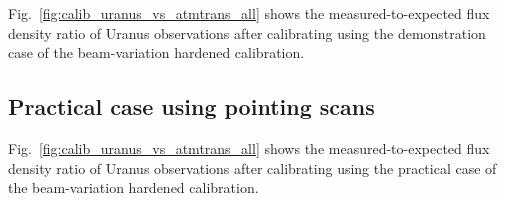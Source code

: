
Fig.~\ref{fig:calib_uranus_vs_atmtrans_all} shows the
measured-to-expected flux density ratio of Uranus observations after
calibrating using the demonstration case of the beam-variation
hardened calibration. 


\subsection{Practical case using pointing scans}
\label{se:photocorr_pointing}


Fig.~\ref{fig:calib_uranus_vs_atmtrans_all} shows the
measured-to-expected flux density ratio of Uranus observations after
calibrating using the practical case of the beam-variation
hardened calibration. 


